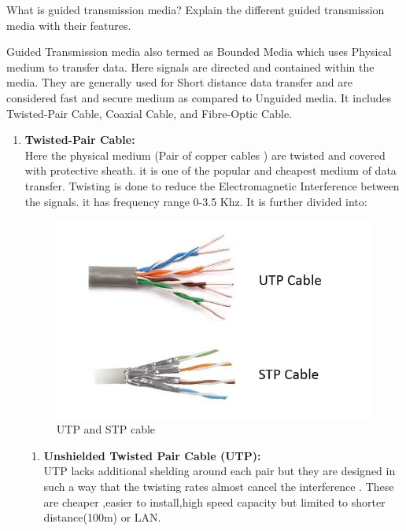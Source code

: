 \documentclass[a4paper,12pt]{article}
\begin{document}
\tableofcontents
\pagebreak
\listoffigures
\pagebreak
\listoftables
\pagebreak
{}

\begin{Q}
{What is guided transmission media? Explain the different guided transmission media with their features.}
\end{Q}

\begin{A}{Guided Transmission media also termed as Bounded Media which uses Physical medium to transfer data. Here signals are directed and contained within the media. They are generally used for Short distance data transfer and are considered fast and secure medium as compared to Unguided media. It includes Twisted-Pair Cable, Coaxial Cable, and Fibre-Optic Cable.
\begin{enumerate}
\item \textbf{Twisted-Pair Cable:}\\ Here the physical medium (Pair of copper cables ) are twisted and covered with protective sheath. it is one of the popular and cheapest medium of data transfer. Twisting is done to reduce the Electromagnetic Interference between the signals. it has frequency range 0-3.5 Khz. It is further divided into:
\begin{figure}[h]
\centering
	\includegraphics[scale=0.7,cframe=blue 0.5pt 3pt]{utpstp.jpg}
	\caption{{UTP and STP cable}}
\end{figure}
	\begin{enumerate}
   		\item \textbf{Unshielded Twisted Pair Cable (UTP):}\\UTP lacks additional shelding around each pair but they are designed in such a way that the twisting rates almost cancel the interference . These are cheaper ,easier to install,high speed capacity but limited to shorter distance(100m) or LAN.

\end{enumerate}
\end{enumerate}}
\end{A}
\end{document}
